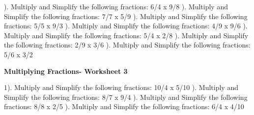 \documentclass{article}%
\begin{document}
). Multiply and Simplify the following fractions: 6/4 x 9/8%
\newline%
\newline%
). Multiply and Simplify the following fractions: 7/7 x 5/9%
\newline%
\newline%
). Multiply and Simplify the following fractions: 5/5 x 9/3%
\newline%
\newline%
). Multiply and Simplify the following fractions: 4/9 x 9/6%
\newline%
\newline%
). Multiply and Simplify the following fractions: 5/4 x 2/8%
\newline%
\newline%
). Multiply and Simplify the following fractions: 2/9 x 3/6%
\newline%
\newline%
). Multiply and Simplify the following fractions: 5/6 x 3/2%
\newline%
\newline%
\newline%
\pagebreak%
\large%
\begin{center}%
\textbf{Multiplying Fractions- Worksheet 3}%
\newline%
\newline%
\newline%
\end{center} \normalsize%
1). Multiply and Simplify the following fractions: 10/4 x 5/10%
\newline%
\newline%
). Multiply and Simplify the following fractions: 8/7 x 9/4%
\newline%
\newline%
). Multiply and Simplify the following fractions: 8/8 x 2/5%
\newline%
\newline%
). Multiply and Simplify the following fractions: 6/4 x 4/10%
\newline%
\end{document}

